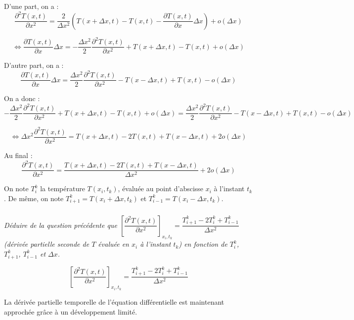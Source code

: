 \documentclass[10pt,fleqn]{article} %
\begin{document}
\ifprof
\begin{corrige}
D'une part, on a : 
$$
\dfrac{\partial^2 T(x,t)}{\partial x^2} 
= \dfrac{2}{\Delta x^2}\left( T(x+\Delta x,t)-T(x,t)-\dfrac{\partial T(x,t)}{\partial x}\Delta x \right) + o\left(\Delta x\right)
$$

$$
\Leftrightarrow 
\dfrac{\partial T(x,t)}{\partial x}\Delta x 
= -  \dfrac{\Delta x^2}{2}\dfrac{\partial^2 T(x,t)}{\partial x^2}  +T(x+\Delta x,t)-T(x,t) + o\left(\Delta x\right)
$$

D'autre part, on a : 
$$
\dfrac{\partial T(x,t)}{\partial x}\Delta x  
=
\dfrac{\Delta x^2}{2} \dfrac{\partial^2 T(x,t)}{\partial x^2} - T(x-\Delta x,t)+T(x,t) - o\left(\Delta x\right)
$$

On a donc : 
$$
-  \dfrac{\Delta x^2}{2}\dfrac{\partial^2 T(x,t)}{\partial x^2}  +T(x+\Delta x,t)-T(x,t) + o\left(\Delta x\right)
=
\dfrac{\Delta x^2}{2} \dfrac{\partial^2 T(x,t)}{\partial x^2} - T(x-\Delta x,t)+T(x,t) - o\left(\Delta x\right)
$$

$$
\Leftrightarrow
\Delta x^2 \dfrac{\partial^2 T(x,t)}{\partial x^2} 
=
T(x+\Delta x,t)-2T(x,t) + T(x-\Delta x,t)+ 2o\left(\Delta x\right)
$$

Au final : 
$$
\dfrac{\partial^2 T(x,t)}{\partial x^2} 
=
\dfrac{T(x+\Delta x,t)-2T(x,t) + T(x-\Delta x,t)}{\Delta x^2 }+ 2o\left(\Delta x\right)
$$
\end{corrige}

\else
\fi

On note $T_i^k$ la température $T\left(x_i,t_k\right)$, évaluée au point d'abscisse $x_i$ à l'instant $t_k$. De même, on note $T_{i+1}^k=T\left(x_i + \Delta x,t_k \right)$ et $T_{i-1}^k=T\left(x_i - \Delta x,t_k \right)$.

\subparagraph{}\textit{Déduire de la question précédente que  $\left[\dfrac{\partial^2 T(x,t)}{\partial x^2}\right]_{x_i,t_k} =\dfrac{T_{i+1}^k-2T_{i}^k + T_{i-1}^k}{\Delta x^2 } $ (dérivée partielle seconde de 
$T$ évaluée en $x_i$ à l'instant $t_k$) en fonction de $T_i^k$, $T_{i+1}^k$, $T_{i-1}^k$ et $\Delta x$.}
\ifprof
\begin{corrige}
$$
\left[\dfrac{\partial^2 T(x,t)}{\partial x^2}\right]_{x_i,t_k} 
=
\dfrac{T_{i+1}^k-2T_{i}^k + T_{i-1}^k}{\Delta x^2 }
$$
\end{corrige}
\else
\fi

\vspace{0.5cm}
La dérivée partielle temporelle de l'équation différentielle est maintenant approchée grâce à un
développement limité.
\end{document}
